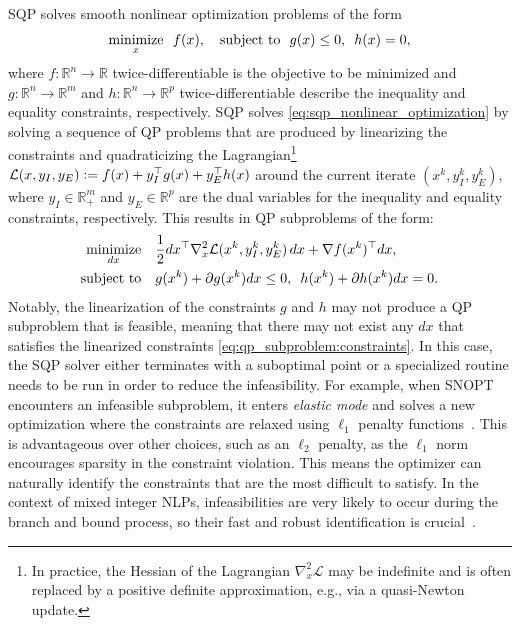 \documentclass{article} %
\newcommand{\R}{\mathbb{R}}
\DeclareMathOperator*{\minimize}{minimize}
\DeclareMathOperator*{\st}{subject\ to}
\newcommand{\defeq}{\vcentcolon=}
\newcommand{\hquad}{\hspace{0.5em}}
\begin{document}
SQP solves smooth nonlinear optimization problems of the form
\begin{equation} \label{eq:sqp_nonlinear_optimization}
    \minimize_x \hquad f(x), \quad \st \hquad g(x) \leq 0, \hquad h(x) = 0,
\end{equation}
where $f: \R^n \to \R$ twice-differentiable is the objective to be minimized and $g: \R^n \to \R^m$ and $h: \R^n \to \R^p$ twice-differentiable describe the inequality and equality constraints, respectively.
SQP solves \cref{eq:sqp_nonlinear_optimization} by solving a sequence of QP problems that are produced by linearizing the constraints and quadraticizing the Lagrangian\footnote{In practice, the Hessian of the Lagrangian $\nabla_x^2 \mathcal{L}$ may be indefinite and is often replaced by a positive definite approximation, e.g., via a quasi-Newton update.} $\mathcal{L}(x, y_I, y_E) \defeq f(x) + y_I^\top g(x) + y_E^\top h(x)$ around the current iterate $(x^k, y_I^k, y_E^k)$, where $y_I \in \R^m_+$ and $y_E \in \R^p$ are the dual variables for the inequality and equality constraints, respectively.
This results in QP subproblems of the form:
\begin{subequations} \label{eq:qp_subproblem}
\begin{align}
    \minimize_{dx} \quad   & \frac{1}{2} dx^\top \nabla_x^2 \mathcal{L}(x^k, y_I^k, y_E^k) \, dx + \nabla f(x^k)^\top dx, \\
    \st \quad & g(x^k) + \partial g(x^k) dx \leq 0, \hquad h(x^k) + \partial h(x^k) dx = 0. \label{eq:qp_subproblem:constraints}
\end{align}
\end{subequations}
Notably, the linearization of the constraints $g$ and $h$ may not produce a QP subproblem that is feasible, meaning that there may not exist any $dx$ that satisfies the linearized constraints \cref{eq:qp_subproblem:constraints}.
In this case, the SQP solver either terminates with a suboptimal point or a specialized routine needs to be run in order to reduce the infeasibility.
For example, when SNOPT encounters an infeasible subproblem, it enters \textit{elastic mode} and solves a new optimization where the constraints are relaxed using $\ell_1$ penalty functions~\citep{gill2005snopt}.
This is advantageous over other choices, such as an $\ell_2$ penalty, as the $\ell_1$ norm encourages sparsity in the constraint violation.
This means the optimizer can naturally identify the constraints that are the most difficult to satisfy.
In the context of mixed integer NLPs, infeasibilities are very likely to occur during the branch and bound process, so their fast and robust identification is crucial~\citep{gill2011sequential}.
\end{document}
